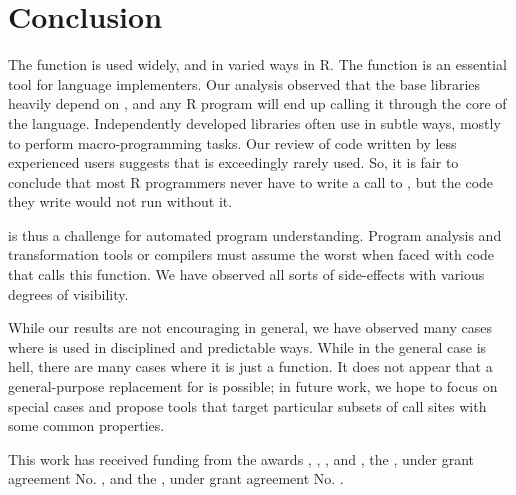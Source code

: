 \documentclass[acmsmall, screen]{acmart}
\begin{document}
\section{Conclusion}

The \eval function is used widely, and in varied ways in R. The function is an
essential tool for language implementers. Our analysis observed that the base
libraries heavily depend on \eval, and any R program will end up calling it
through the core of the language. Independently developed libraries often use
\eval in subtle ways, mostly to perform macro-programming tasks. Our review of
code written by less experienced users suggests that \eval is exceedingly rarely
used. So, it is fair to conclude that most R programmers never have to
write a call to \eval, but the code they write would not run without it.

\Eval is thus a challenge for automated program understanding. Program analysis
and transformation tools or compilers must assume the worst when faced with code
that calls this function. We have observed all sorts of side-effects with
various degrees of visibility.

While our results are not encouraging in general, we have observed many cases
where \eval is used in disciplined and predictable ways. While in the general
case \eval is hell, there are many cases where it is just a function. It does
not appear that a general-purpose replacement for \eval is possible; in future
work, we hope to focus on special cases and propose tools that target particular
subsets of call sites with some common properties.


\begin{acks}
  This work has received funding from the
 awards
, ,
, and , the
, under grant agreement No.
, and the
, under
grant agreement No.  .
\end{acks}



\end{document}
